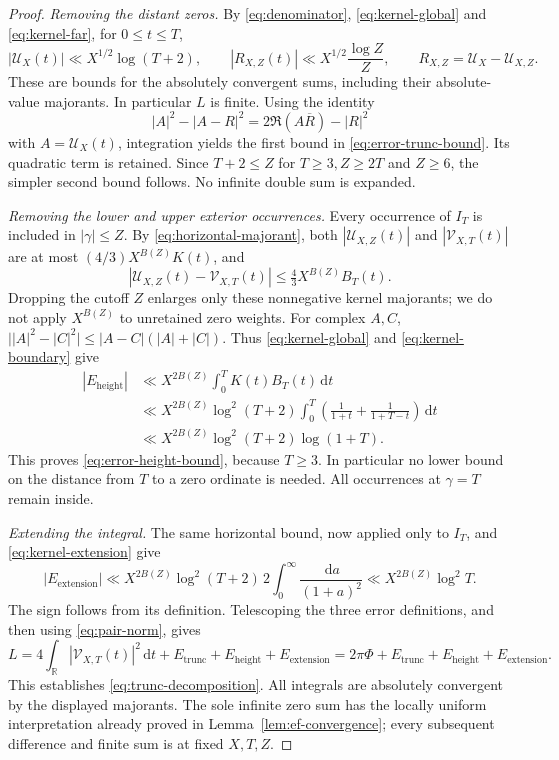\documentclass[11pt]{article}
\newcommand{\dd}{\,\mathrm d}
\newcommand{\VS}{\mathcal V}
\newcommand{\US}{\mathcal U}
\newcommand{\ELtr}{E_{\mathrm{trunc}}}
\newcommand{\ELh}{E_{\mathrm{height}}}
\newcommand{\ELext}{E_{\mathrm{extension}}}
\begin{document}
\begin{proof}
\textit{Removing the distant zeros.}
By \eqref{eq:denominator}, \eqref{eq:kernel-global} and
\eqref{eq:kernel-far}, for \(0\leq t\leq T\),
\[
 |\US_X(t)|\ll X^{1/2}\log(T+2),\qquad
 |R_{X,Z}(t)|\ll X^{1/2}\frac{\log Z}{Z},
 \qquad R_{X,Z}=\US_X-\US_{X,Z}.
\]
These are bounds for the absolutely convergent sums, including their
absolute-value majorants. In particular \(L\) is finite.
Using the identity
\[
 |A|^2-|A-R|^2=2\Re(A\overline R)-|R|^2
\]
with \(A=\US_X(t)\), integration yields the first bound in
\eqref{eq:error-trunc-bound}. Its quadratic term is retained.
Since \(T+2\leq Z\) for \(T\geq3,Z\geq2T\) and \(Z\geq6\),
the simpler second bound follows. No infinite double sum is expanded.

\textit{Removing the lower and upper exterior occurrences.}
Every occurrence of \(I_T\) is included in \(|\gamma|\leq Z\).
By \eqref{eq:horizontal-majorant}, both
\(|\US_{X,Z}(t)|\) and \(|\VS_{X,T}(t)|\) are at most
\((4/3)X^{B(Z)}K(t)\), and
\[
 |\US_{X,Z}(t)-\VS_{X,T}(t)|
 \leq\tfrac43X^{B(Z)}B_T(t).
\]
Dropping the cutoff \(Z\) enlarges only these nonnegative kernel
majorants; we do not apply \(X^{B(Z)}\) to unretained zero weights.
For complex \(A,C\),
\(\bigl||A|^2-|C|^2\bigr|\leq|A-C|(|A|+|C|)\).
Thus \eqref{eq:kernel-global} and \eqref{eq:kernel-boundary} give
\begin{align*}
 |\ELh|
 &\ll X^{2B(Z)}\int_0^T K(t)B_T(t)\dd t\\
 &\ll X^{2B(Z)}\log^2(T+2)
       \int_0^T\left(\frac1{1+t}+\frac1{1+T-t}\right)\dd t\\
 &\ll X^{2B(Z)}\log^2(T+2)\log(1+T).
\end{align*}
This proves \eqref{eq:error-height-bound}, because \(T\geq3\).
In particular no lower bound on the distance from \(T\) to a zero
ordinate is needed. All occurrences at \(\gamma=T\) remain inside.

\textit{Extending the integral.}
The same horizontal bound, now applied only to \(I_T\), and
\eqref{eq:kernel-extension} give
\[
 |\ELext|
 \ll X^{2B(Z)}\log^2(T+2)\,
        2\int_0^\infty\frac{\dd a}{(1+a)^2}
 \ll X^{2B(Z)}\log^2T.
\]
The sign follows from its definition. Telescoping the three error
definitions, and then using \eqref{eq:pair-norm}, gives
\[
 L=4\int_{\mathbb R}|\VS_{X,T}(t)|^2\dd t
       +\ELtr+\ELh+\ELext
   =2\pi\Phi+\ELtr+\ELh+\ELext.
\]
This establishes \eqref{eq:trunc-decomposition}. All integrals are
absolutely convergent by the displayed majorants. The sole infinite
zero sum has the locally uniform interpretation already proved in
Lemma~\ref{lem:ef-convergence}; every subsequent difference and finite
sum is at fixed \(X,T,Z\).


\end{proof}
\end{document}
